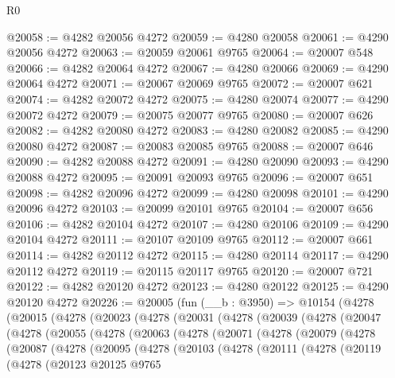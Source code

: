 \begin{lexlean}{R0}
\begin{coremodule}
@20058 := @4282 @20056 @4272
@20059 := @4280 @20058
@20061 := @4290 @20056 @4272
@20063 := @20059 @20061 @9765
@20064 := @20007 @548
@20066 := @4282 @20064 @4272
@20067 := @4280 @20066
@20069 := @4290 @20064 @4272
@20071 := @20067 @20069 @9765
@20072 := @20007 @621
@20074 := @4282 @20072 @4272
@20075 := @4280 @20074
@20077 := @4290 @20072 @4272
@20079 := @20075 @20077 @9765
@20080 := @20007 @626
@20082 := @4282 @20080 @4272
@20083 := @4280 @20082
@20085 := @4290 @20080 @4272
@20087 := @20083 @20085 @9765
@20088 := @20007 @646
@20090 := @4282 @20088 @4272
@20091 := @4280 @20090
@20093 := @4290 @20088 @4272
@20095 := @20091 @20093 @9765
@20096 := @20007 @651
@20098 := @4282 @20096 @4272
@20099 := @4280 @20098
@20101 := @4290 @20096 @4272
@20103 := @20099 @20101 @9765
@20104 := @20007 @656
@20106 := @4282 @20104 @4272
@20107 := @4280 @20106
@20109 := @4290 @20104 @4272
@20111 := @20107 @20109 @9765
@20112 := @20007 @661
@20114 := @4282 @20112 @4272
@20115 := @4280 @20114
@20117 := @4290 @20112 @4272
@20119 := @20115 @20117 @9765
@20120 := @20007 @721
@20122 := @4282 @20120 @4272
@20123 := @4280 @20122
@20125 := @4290 @20120 @4272
@20226 := @20005
    (fun (__b : @3950) =>
    @10154
      (@4278
        (@20015
          (@4278
            (@20023
              (@4278
                (@20031
                  (@4278
                    (@20039
                      (@4278
                        (@20047
                          (@4278
                            (@20055
                              (@4278
                                (@20063
                                  (@4278
                                    (@20071
                                      (@4278
                                        (@20079
                                          (@4278
                                            (@20087
                                              (@4278
                                                (@20095
                                                  (@4278
                                                    (@20103
                                                      (@4278
                                                        (@20111
                                                          (@4278
                                                            (@20119
                                                              (@4278
                                                                (@20123
                                                                  @20125
                                                                  @9765

\end{coremodule}
\end{lexlean}
